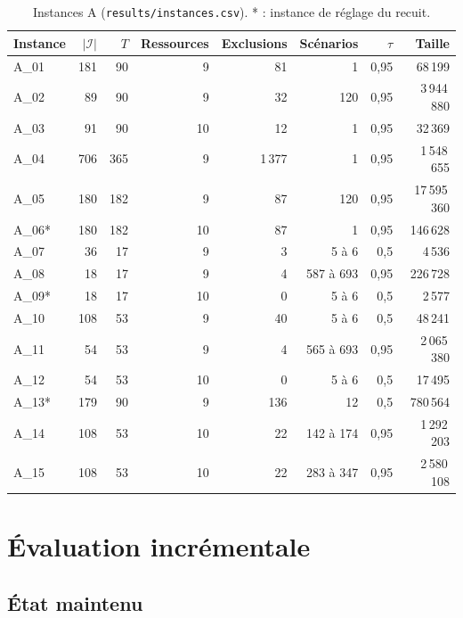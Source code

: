\documentclass[11pt,a4paper]{report}
\newcommand{\I}{\mathcal{I}}
\begin{document}
\begin{table}[H]
\centering
\small
\caption{Instances A (\texttt{results/instances.csv}). * : instance de réglage du recuit.}
\label{tab:instances}
\begin{tabular}{lrrrrrrr}
\toprule
Instance & $|\I|$ & $T$ & Ressources & Exclusions & Scénarios & $\tau$ & Taille \\
\midrule
A\_01 & 181 & 90 & 9 & 81 & 1 & 0,95 & 68\,199 \\
A\_02 & 89 & 90 & 9 & 32 & 120 & 0,95 & 3\,944\,880 \\
A\_03 & 91 & 90 & 10 & 12 & 1 & 0,95 & 32\,369 \\
A\_04 & 706 & 365 & 9 & 1\,377 & 1 & 0,95 & 1\,548\,655 \\
A\_05 & 180 & 182 & 9 & 87 & 120 & 0,95 & 17\,595\,360 \\
A\_06* & 180 & 182 & 10 & 87 & 1 & 0,95 & 146\,628 \\
A\_07 & 36 & 17 & 9 & 3 & 5 à 6 & 0,5 & 4\,536 \\
A\_08 & 18 & 17 & 9 & 4 & 587 à 693 & 0,95 & 226\,728 \\
A\_09* & 18 & 17 & 10 & 0 & 5 à 6 & 0,5 & 2\,577 \\
A\_10 & 108 & 53 & 9 & 40 & 5 à 6 & 0,5 & 48\,241 \\
A\_11 & 54 & 53 & 9 & 4 & 565 à 693 & 0,95 & 2\,065\,380 \\
A\_12 & 54 & 53 & 10 & 0 & 5 à 6 & 0,5 & 17\,495 \\
A\_13* & 179 & 90 & 9 & 136 & 12 & 0,5 & 780\,564 \\
A\_14 & 108 & 53 & 10 & 22 & 142 à 174 & 0,95 & 1\,292\,203 \\
A\_15 & 108 & 53 & 10 & 22 & 283 à 347 & 0,95 & 2\,580\,108 \\
\bottomrule
\end{tabular}
\end{table}

\chapter{Évaluation incrémentale}\label{chap:evaluation}

\section{État maintenu}
\end{document}
